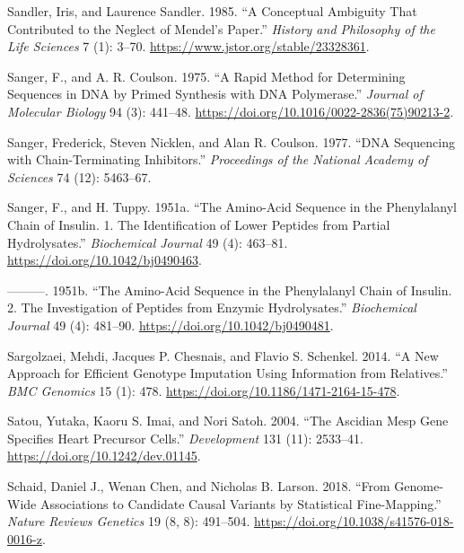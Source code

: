 \documentclass[
]{book}
\newlength{\cslhangindent}
\newlength{\cslentryspacingunit} %
\newenvironment{CSLReferences}[2] %
 {%
  \setlength{\parindent}{0pt}
  \ifodd #1
  \let\oldpar\par
  \def\par{\hangindent=\cslhangindent\oldpar}
  \fi
  \setlength{\parskip}{#2\cslentryspacingunit}
 }%
 {}
\begin{document}
\begin{CSLReferences}{1}{0}
\leavevmode{}%
Sandler, Iris, and Laurence Sandler. 1985. {``A {Conceptual Ambiguity} That {Contributed} to the {Neglect} of {Mendel}'s {Paper}.''} \emph{History and Philosophy of the Life Sciences} 7 (1): 3--70. \url{https://www.jstor.org/stable/23328361}.

\leavevmode{}%
Sanger, F., and A. R. Coulson. 1975. {``A Rapid Method for Determining Sequences in {DNA} by Primed Synthesis with {DNA} Polymerase.''} \emph{Journal of Molecular Biology} 94 (3): 441--48. \url{https://doi.org/10.1016/0022-2836(75)90213-2}.

\leavevmode{}%
Sanger, Frederick, Steven Nicklen, and Alan R. Coulson. 1977. {``{DNA} Sequencing with Chain-Terminating Inhibitors.''} \emph{Proceedings of the National Academy of Sciences} 74 (12): 5463--67.

\leavevmode{}%
Sanger, F., and H. Tuppy. 1951a. {``The Amino-Acid Sequence in the Phenylalanyl Chain of Insulin. 1. {The} Identification of Lower Peptides from Partial Hydrolysates.''} \emph{Biochemical Journal} 49 (4): 463--81. \url{https://doi.org/10.1042/bj0490463}.

\leavevmode{}%
---------. 1951b. {``The Amino-Acid Sequence in the Phenylalanyl Chain of Insulin. 2. {The} Investigation of Peptides from Enzymic Hydrolysates.''} \emph{Biochemical Journal} 49 (4): 481--90. \url{https://doi.org/10.1042/bj0490481}.

\leavevmode{}%
Sargolzaei, Mehdi, Jacques P. Chesnais, and Flavio S. Schenkel. 2014. {``A New Approach for Efficient Genotype Imputation Using Information from Relatives.''} \emph{BMC Genomics} 15 (1): 478. \url{https://doi.org/10.1186/1471-2164-15-478}.

\leavevmode{}%
Satou, Yutaka, Kaoru S. Imai, and Nori Satoh. 2004. {``The Ascidian {Mesp} Gene Specifies Heart Precursor Cells.''} \emph{Development} 131 (11): 2533--41. \url{https://doi.org/10.1242/dev.01145}.

\leavevmode{}%
Schaid, Daniel J., Wenan Chen, and Nicholas B. Larson. 2018. {``From Genome-Wide Associations to Candidate Causal Variants by Statistical Fine-Mapping.''} \emph{Nature Reviews Genetics} 19 (8, 8): 491--504. \url{https://doi.org/10.1038/s41576-018-0016-z}.


\end{CSLReferences}
\end{document}
